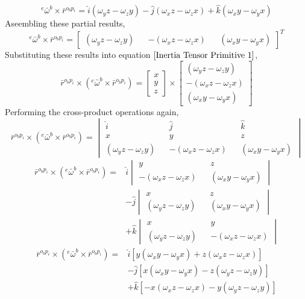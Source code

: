 $${}^{e}\bar{\omega}^{b}\times\bar{r}^{o_{b}p_{i}} = 
\hat{i}(\omega_{y}z - \omega_{z}y)
-
\hat{j}(\omega_{x}z - \omega_{z}x)
+
\hat{k}(\omega_{x}y - \omega_{y}x)$$
Aseembling these partial results,
$${}^{e}\bar{\omega}^{b}\times\bar{r}^{o_{b}p_{i}} = \begin{bmatrix}
(\omega_{y}z - \omega_{z}y) && -(\omega_{x}z - \omega_{z}x) && (\omega_{x}y - \omega_{y}x)
\end{bmatrix}^{T}$$
Substituting these results into equation $\ref{Inertia Tensor Primitive 1}$,
$$\bar{r}^{o_{b}p_{i}}\times\left({}^{e}\bar{\omega}^{b}\times\bar{r}^{o_{b}p_{i}}\right) = 
\begin{bmatrix}
x \\ y \\ z
\end{bmatrix} \times 
\begin{bmatrix}
(\omega_{y}z - \omega_{z}y) \\ -(\omega_{x}z - \omega_{z}x) \\ (\omega_{x}y - \omega_{y}x)
\end{bmatrix}$$
Performing the cross-product operations again,
$$\bar{r}^{o_{b}p_{i}}\times\left({}^{e}\bar{\omega}^{b}\times\bar{r}^{o_{b}p_{i}}\right) = 
\begin{vmatrix}
\hat{i} && \hat{j} && \hat{k} \\
x && y && z \\
(\omega_{y}z - \omega_{z}y) && -(\omega_{x}z - \omega_{z}x) && (\omega_{x}y - \omega_{y}x)
\end{vmatrix}$$
\begin{align*}\bar{r}^{o_{b}p_{i}}\times\left({}^{e}\bar{\omega}^{b}\times\bar{r}^{o_{b}p_{i}}\right) = &
\hat{i}\begin{vmatrix}
y && z \\
-(\omega_{x}z - \omega_{z}x) && (\omega_{x}y - \omega_{y}x)
\end{vmatrix}
\\ & - 
\hat{j}\begin{vmatrix}
x && z \\
(\omega_{y}z - \omega_{z}y) && (\omega_{x}y - \omega_{y}x)
\end{vmatrix}
\\ & + 
\hat{k}\begin{vmatrix}
x && y \\
(\omega_{y}z - \omega_{z}y) && -(\omega_{x}z - \omega_{z}x)
\end{vmatrix}
\end{align*}
\begin{align*}
\bar{r}^{o_{b}p_{i}}\times\left({}^{e}\bar{\omega}^{b}\times\bar{r}^{o_{b}p_{i}}\right) = &
\hat{i}\left[y(\omega_{x}y - \omega_{y}x) + z(\omega_{x}z - \omega_{z}x)\right]
\\ & - \hat{j}\left[x(\omega_{x}y - \omega_{y}x) - z(\omega_{y}z - \omega_{z}y)\right]
\\ & + \hat{k}\left[-x(\omega_{x}z - \omega_{z}x) - y(\omega_{y}z - \omega_{z}y)\right]
\end{align*}
